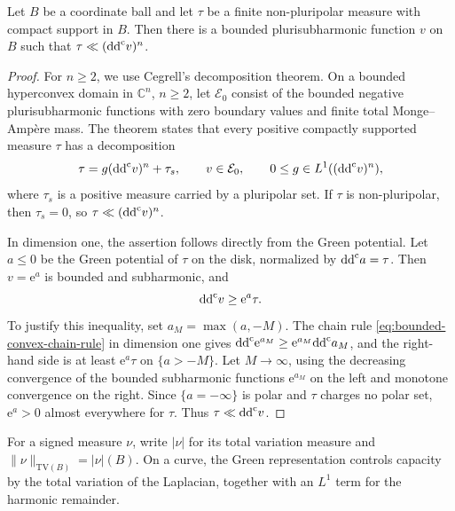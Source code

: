 \begin{lemma}\label{lem:local-bounded-measure-carrier}
Let $B$ be a coordinate ball and let $\tau$ be a finite non-pluripolar measure with compact support in $B$. Then there is a bounded plurisubharmonic function $v$ on $B$ such that $\tau\ll(\mathrm{dd}^{\mathrm{c}} v)^n$.
\end{lemma}
\begin{proof}
For $n\geq2$, we use Cegrell's decomposition theorem. On a bounded hyperconvex domain in $\mathbb C^n$, $n\geq2$, let $\mathcal E_0$ consist of the bounded negative plurisubharmonic functions with zero boundary values and finite total Monge--Amp\`ere mass. The theorem states that every positive compactly supported measure $\tau$ has a decomposition
\[
 \tau=g(\mathrm{dd}^{\mathrm{c}} v)^n+\tau_s,
 \qquad v\in\mathcal E_0,\qquad
 0\leq g\in L^1((\mathrm{dd}^{\mathrm{c}} v)^n),
\]
where $\tau_s$ is a positive measure carried by a pluripolar set. If $\tau$ is non-pluripolar, then $\tau_s=0$, so $\tau\ll(\mathrm{dd}^{\mathrm{c}} v)^n$.

In dimension one, the assertion follows directly from the Green potential. Let $a\leq0$ be the Green potential of $\tau$ on the disk, normalized by $\mathrm{dd}^{\mathrm{c}} a=\tau$. Then $v=\mathrm{e}^a$ is bounded and subharmonic, and
\[
 \mathrm{dd}^{\mathrm{c}} v\geq \mathrm{e}^a\tau.
\]
To justify this inequality, set $a_M=\max(a,-M)$. The chain rule \eqref{eq:bounded-convex-chain-rule} in dimension one gives
$\mathrm{dd}^{\mathrm{c}} \mathrm{e}^{a_M}\geq \mathrm{e}^{a_M}\mathrm{dd}^{\mathrm{c}} a_M$, and the right-hand side is at least $\mathrm{e}^a\tau$ on $\{a>-M\}$. Let $M\to\infty$, using the decreasing convergence of the bounded subharmonic functions $\mathrm{e}^{a_M}$ on the left and monotone convergence on the right. Since $\{a=-\infty\}$ is polar and $\tau$ charges no polar set, $\mathrm{e}^a>0$ almost everywhere for $\tau$. Thus $\tau\ll\mathrm{dd}^{\mathrm{c}} v$.
\end{proof}

For a signed measure $\nu$, write $|\nu|$ for its total variation measure and $\|\nu\|_{\mathrm{TV}(B)}=|\nu|(B)$. On a curve, the Green representation controls capacity by the total variation of the Laplacian, together with an $L^1$ term for the harmonic remainder.

